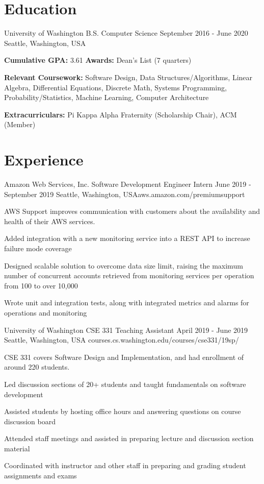\documentclass{resume}
\begin{document}
\maketitle

\section{Education}

\school
{University of Washington}
{B.S. Computer Science}
{September 2016 - June 2020}
{Seattle, Washington, USA}
{\textbf{Cumulative GPA:} 3.61 \blt \textbf{Awards:} Dean's List (7 quarters)

  \textbf{Relevant Coursework:} Software Design, Data Structures/Algorithms, 
  Linear Algebra, Differential Equations, Discrete Math, Systems Programming,
  Probability/Statistics, Machine Learning, Computer Architecture

  \textbf{Extracurriculars:} Pi Kappa Alpha Fraternity (Scholarship Chair), 
  ACM (Member)
}

\section{Experience}

\job
{Amazon Web Services, Inc.}
{Software Development Engineer Intern}
{June 2019 - September 2019}
{Seattle, Washington, USA}{aws.amazon.com/premiumsupport}
{
  AWS Support improves communication with customers about the availability 
  and health of their AWS services.
  \begin{overview}
    \item Added integration with a new monitoring service into a REST API to increase failure mode coverage
    \item Designed scalable solution to overcome data size limit, raising the maximum number of concurrent accounts retrieved from monitoring services per operation from 100 to over 10,000
    \item Wrote unit and integration tests, along with integrated metrics and alarms for operations and monitoring
  \end{overview}
}

\job
{University of Washington}
{CSE 331 Teaching Assistant}
{April 2019 - June 2019}
{Seattle, Washington, USA}
{courses.cs.washington.edu/courses/cse331/19sp/}
{
  CSE 331 covers Software Design and Implementation, and had enrollment of around 220 students.
  \begin{overview}
    \item Led discussion sections of 20+ students and taught fundamentals on
          software development
    \item Assisted students by hosting office hours and answering questions on 
          course discussion board
    \item Attended staff meetings and assisted in preparing lecture and 
          discussion section material
    \item Coordinated with instructor and other staff in preparing and grading 
          student assignments and exams
  \end{overview}
}
\end{document}
